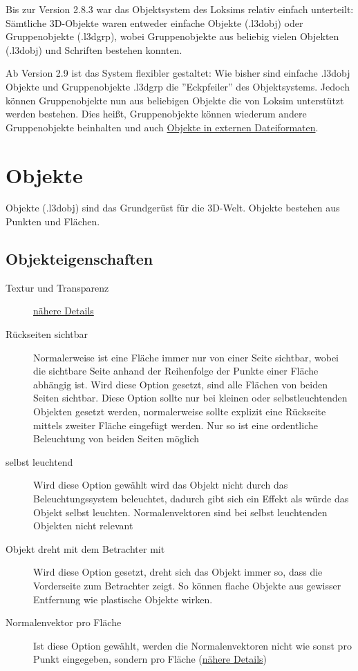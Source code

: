 \label{sec:editor-obj}
Bis zur Version 2.8.3 war das Objektsystem des Loksims relativ einfach unterteilt: Sämtliche 3D-Objekte waren entweder einfache Objekte (.l3dobj) oder Gruppenobjekte (.l3dgrp), wobei Gruppenobjekte aus beliebig vielen Objekten (.l3dobj) und Schriften bestehen konnten.

Ab Version 2.9 ist das System flexibler gestaltet: Wie bisher sind einfache .l3dobj Objekte und Gruppenobjekte .l3dgrp die ''Eckpfeiler'' des Objektsystems. Jedoch können Gruppenobjekte nun aus beliebigen Objekte die von Loksim unterstützt werden bestehen. Dies heißt, Gruppenobjekte können wiederum andere Gruppenobjekte beinhalten und auch \hyperref[sec:editor-obj-externe]{Objekte in externen Dateiformaten}.


\section{Objekte}
\label{sec:editor-obj-l3dobj}
Objekte (.l3dobj) sind das Grundgerüst für die 3D-Welt. Objekte bestehen aus Punkten und Flächen.

\subsection{Objekteigenschaften}
\begin{description}
\item[Textur und Transparenz]\hyperref[sec:editor-obj-textur]{nähere Details}
\item[Rückseiten sichtbar] Normalerweise ist eine Fläche immer nur von einer Seite sichtbar, wobei die sichtbare Seite anhand der Reihenfolge der Punkte einer Fläche abhängig ist. Wird diese Option gesetzt, sind alle Flächen von beiden Seiten sichtbar. Diese Option sollte nur bei kleinen oder selbstleuchtenden Objekten gesetzt werden, normalerweise sollte explizit eine Rückseite mittels zweiter Fläche eingefügt werden. Nur so ist eine ordentliche Beleuchtung von beiden Seiten möglich
\item[selbst leuchtend] Wird diese Option gewählt wird das Objekt nicht durch das Beleuchtungssystem beleuchtet, dadurch gibt sich ein Effekt als würde das Objekt selbst leuchten. Normalenvektoren sind bei selbst leuchtenden Objekten nicht relevant
\item[Objekt dreht mit dem Betrachter mit] Wird diese Option gesetzt, dreht sich das Objekt immer so, dass die Vorderseite zum Betrachter zeigt. So können flache Objekte aus gewisser Entfernung wie plastische Objekte wirken. 
\item[Normalenvektor pro Fläche] Ist diese Option gewählt, werden die Normalenvektoren nicht wie sonst pro Punkt eingegeben, sondern pro Fläche (\hyperref[sec:editor-obj-l3dobj-normalen]{nähere Details})
\end{description}


